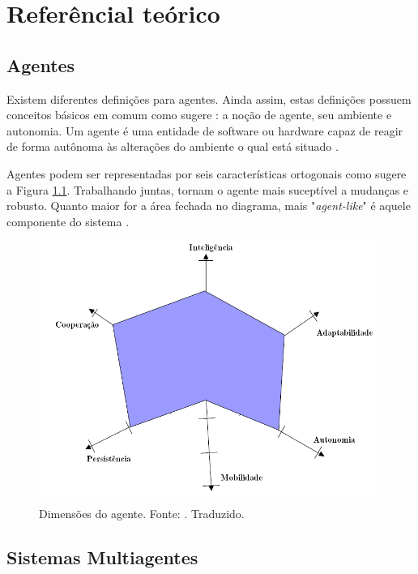\chapter[Referêncial teórico]{Referêncial teórico}

\section{Agentes}

Existem diferentes definições para agentes. Ainda assim, estas definições possuem conceitos básicos em comum como sugere \cite{mcarthur2007multi}: a noção de agente, seu ambiente e autonomia. Um agente é uma entidade de software ou hardware capaz de reagir de forma autônoma às alterações do ambiente o qual está situado .


Agentes podem ser representadas por seis características ortogonais como sugere a Figura \ref{fig:hexagono}. Trabalhando juntas, tornam o agente mais suceptível a mudanças e robusto. Quanto maior for a área fechada no diagrama, mais "\textit{agent-like}" é aquele componente do sistema \cite{griss2001software}.

\begin{figure}[h!]
    \includegraphics[scale=0.7]{figuras/hexagono_agente}
    \centering
    \caption{Dimensões do agente. Fonte: \cite{griss2001software}. Traduzido.}
    \label{fig:hexagono}
\end{figure}

\section{Sistemas Multiagentes}

